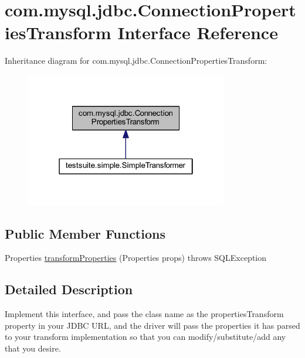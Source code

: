 \hypertarget{interfacecom_1_1mysql_1_1jdbc_1_1_connection_properties_transform}{}\section{com.\+mysql.\+jdbc.\+Connection\+Properties\+Transform Interface Reference}
\label{interfacecom_1_1mysql_1_1jdbc_1_1_connection_properties_transform}


Inheritance diagram for com.\+mysql.\+jdbc.\+Connection\+Properties\+Transform\+:\nopagebreak
\begin{figure}[H]
\begin{center}
\leavevmode
\includegraphics[width=250pt]{interfacecom_1_1mysql_1_1jdbc_1_1_connection_properties_transform__inherit__graph}
\end{center}
\end{figure}
\subsection*{Public Member Functions}
\begin{DoxyCompactItemize}
\item 
Properties \mbox{\hyperlink{interfacecom_1_1mysql_1_1jdbc_1_1_connection_properties_transform_a044765ce0ad5bcba0276eac61fe8e04d}{transform\+Properties}} (Properties props)  throws S\+Q\+L\+Exception
\end{DoxyCompactItemize}


\subsection{Detailed Description}
Implement this interface, and pass the class name as the \textquotesingle{}properties\+Transform\textquotesingle{} property in your J\+D\+BC U\+RL, and the driver will pass the properties it has parsed to your transform implementation so that you can modify/substitute/add any that you desire. 


